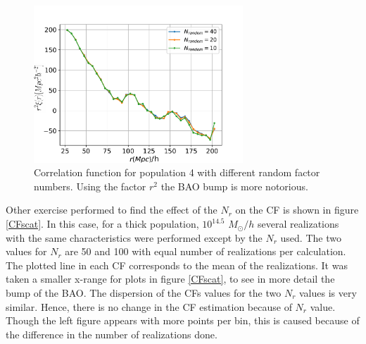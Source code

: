 \begin{figure}[htbp]
       \centering
               \includegraphics[width=0.7\textwidth]{Images/chapter4/CF_1e14_Nrandom.pdf}
       \caption{\small Correlation function for population 4 with different random factor
       numbers. Using the factor $r^2$ the BAO bump is more notorious.  }
       \label{nrandom}
 \end{figure}


Other exercise performed to find the effect of the $N_r$ on the CF is shown
in figure \ref{CFscat}. In this case, for a thick population, $10^{14.5}$ $M_{\odot}/h$
several realizations with the same characteristics were performed except
by the $N_r$ used. The two values for $N_r$ are 50 and 100 with equal number
of realizations per calculation. The plotted line in each CF corresponds to the 
mean of the realizations. It was taken a smaller x-range for plots in figure \ref{CFscat},
to see in more detail the bump of the BAO. 
The dispersion of the CFs values for the two $N_r$ values
is very similar. Hence, there is no change in the CF estimation because of 
$N_r$ value.
Though the left figure appears with more points per bin, this is caused
because of the difference in the number of realizations done. 


